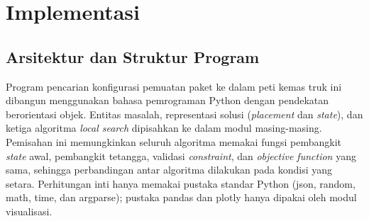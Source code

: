 \renewcommand{\lstlistingname}{Kode}
\providecommand{\pycode}[4][]{%
    \codefile[language=Python,literate={°}{{\textdegree}}1,#1]{#2}{#3}{#4}%
}

\chapter{Implementasi}

\section{Arsitektur dan Struktur Program}

Program pencarian konfigurasi pemuatan paket ke dalam peti kemas truk ini dibangun menggunakan bahasa pemrograman Python dengan pendekatan berorientasi objek. Entitas masalah, representasi solusi (\textit{placement} dan \textit{state}), dan ketiga algoritma \textit{local search} dipisahkan ke dalam modul masing-masing. Pemisahan ini memungkinkan seluruh algoritma memakai fungsi pembangkit \textit{state} awal, pembangkit tetangga, validasi \textit{constraint}, dan \textit{objective function} yang sama, sehingga perbandingan antar algoritma dilakukan pada kondisi yang setara. Perhitungan inti hanya memakai pustaka standar Python (json, random, math, time, dan argparse); pustaka pandas dan plotly hanya dipakai oleh modul visualisasi.

